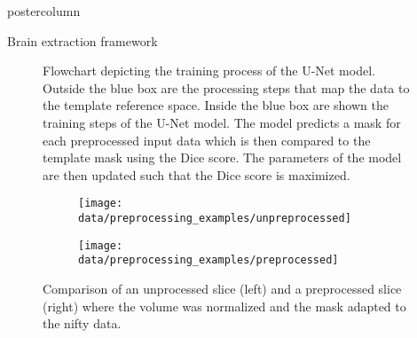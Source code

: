 \begin{frame}
\begin{columns}
\begin{column}{.42\textwidth}
\begin{beamercolorbox}[center]{postercolumn}
\begin{minipage}{.98\textwidth}
{\begin{myblock}{Brain extraction framework}
                                \begin{figure}
                                    \centering
                                    \vspace{0.5em}
                                    \caption{Flowchart depicting the training process of the U-Net model. Outside the blue box are the processing steps that map the data to the template reference space. Inside the blue box are shown the training steps of the U-Net model. The model predicts a mask for each preprocessed input data which is then compared to the template mask using the Dice score. The parameters of the model are then updated such that the Dice score is maximized.}
                                    \label{training_graph}
                                \end{figure}

                                \begin{figure}
                                    \centering
                                    \begin{subfigure}{0.25\textwidth}
                                        \centering
                                        \texttt{[image: data/preprocessing\_examples/unpreprocessed]}
                                    \end{subfigure}
                                    \hspace{2em}
                                    \begin{subfigure}{0.25\textwidth}
                                        \centering
                                        \texttt{[image: data/preprocessing\_examples/preprocessed]}
                                    \end{subfigure}
                                    \vspace{-0.5em}
                                    \caption{Comparison of an unprocessed slice (left) and a preprocessed slice (right) where the volume was normalized and the mask adapted to the nifty data.}
                                    \label{preprocessing_xample}
                                \end{figure}
                            \end{myblock}\vfill





}
\end{minipage}
\end{beamercolorbox}
\end{column}
\end{columns}
\end{frame}
